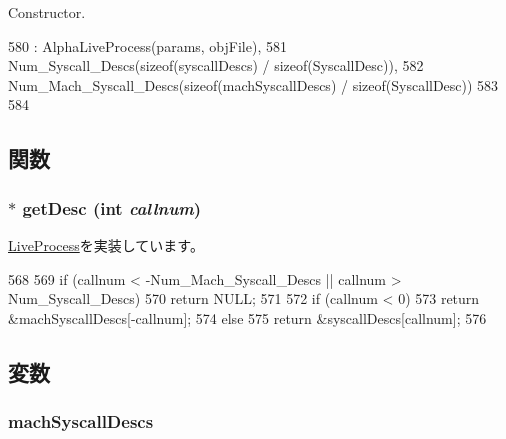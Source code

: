 Constructor. 


\begin{DoxyCode}
580     : AlphaLiveProcess(params, objFile),
581       Num_Syscall_Descs(sizeof(syscallDescs) / sizeof(SyscallDesc)),
582       Num_Mach_Syscall_Descs(sizeof(machSyscallDescs) / sizeof(SyscallDesc))
583 {
584 }
\end{DoxyCode}


\subsection{関数}
\hypertarget{classAlphaISA_1_1AlphaTru64Process_aebbff609a7235342925445690acf5ee8}{
\subsubsection[{getDesc}]{ $\ast$ getDesc (int {\em callnum})}}
\label{classAlphaISA_1_1AlphaTru64Process_aebbff609a7235342925445690acf5ee8}


\hyperlink{classLiveProcess_a478f396f8895ef7728d26866a00121d7}{LiveProcess}を実装しています。


\begin{DoxyCode}
568 {
569     if (callnum < -Num_Mach_Syscall_Descs || callnum > Num_Syscall_Descs)
570         return NULL;
571 
572     if (callnum < 0)
573         return &machSyscallDescs[-callnum];
574     else
575         return &syscallDescs[callnum];
576 }
\end{DoxyCode}


\subsection{変数}
\hypertarget{classAlphaISA_1_1AlphaTru64Process_ab029b90db3c7a2d9f927271d535727c1}{
\subsubsection[{machSyscallDescs}]{ {\bf machSyscallDescs}}}
\label{classAlphaISA_1_1AlphaTru64Process_ab029b90db3c7a2d9f927271d535727c1}


